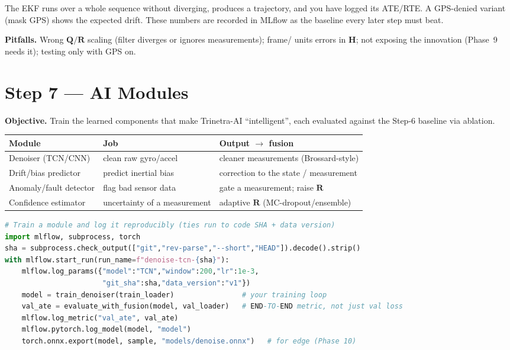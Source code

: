 \documentclass[11pt]{article}
\newcommand{\vv}[1]{\mathbf{#1}}
\begin{document}
\begin{dodbox}
The EKF runs over a whole sequence without diverging, produces a trajectory, and you have logged
its ATE/RTE. A GPS-denied variant (mask GPS) shows the expected drift. These numbers are recorded
in MLflow as the baseline every later step must beat.
\end{dodbox}

\textbf{Pitfalls.} Wrong $\vv{Q}/\vv{R}$ scaling (filter diverges or ignores measurements); frame/
units errors in $\vv{H}$; not exposing the innovation (Phase~9 needs it); testing only with GPS on.

\section{Step 7 --- AI Modules}\label{sec:ai}

\textbf{Objective.} Train the learned components that make Trinetra-AI ``intelligent'', each
evaluated against the Step-6 baseline via ablation.

\begin{center}\footnotesize
\begin{tabular}{@{}p{3.0cm}p{4.4cm}p{4.6cm}@{}}
\toprule
\textbf{Module} & \textbf{Job} & \textbf{Output $\rightarrow$ fusion}\\
\midrule
Denoiser (TCN/CNN) & clean raw gyro/accel & cleaner measurements (Brossard-style)\\
Drift/bias predictor & predict inertial bias & correction to the state / measurement\\
Anomaly/fault detector & flag bad sensor data & gate a measurement; raise $\vv{R}$\\
Confidence estimator & uncertainty of a measurement & adaptive $\vv{R}$ (MC-dropout/ensemble)\\
\bottomrule
\end{tabular}
\end{center}

\begin{actbox}
\begin{lstlisting}[language=Python]
# Train a module and log it reproducibly (ties run to code SHA + data version)
import mlflow, subprocess, torch
sha = subprocess.check_output(["git","rev-parse","--short","HEAD"]).decode().strip()
with mlflow.start_run(run_name=f"denoise-tcn-{sha}"):
    mlflow.log_params({"model":"TCN","window":200,"lr":1e-3,
                       "git_sha":sha,"data_version":"v1"})
    model = train_denoiser(train_loader)                # your training loop
    val_ate = evaluate_with_fusion(model, val_loader)   # END-TO-END metric, not just val loss
    mlflow.log_metric("val_ate", val_ate)
    mlflow.pytorch.log_model(model, "model")
    torch.onnx.export(model, sample, "models/denoise.onnx")   # for edge (Phase 10)
\end{lstlisting}
\end{actbox}
\end{document}
